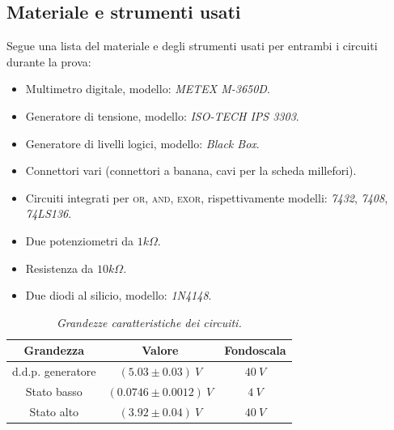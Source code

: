 \subsection{Materiale e strumenti usati}\label{subsec:materiali}
Segue una lista del materiale e degli strumenti usati per entrambi i circuiti durante la prova:
\begin{itemize}
  \item%
  Multimetro digitale, modello: \emph{METEX M-3650D}.
  \item%
  Generatore di tensione, modello: \emph{ISO-TECH IPS 3303}.
  \item%
  Generatore di livelli logici, modello: \emph{Black Box}.
  \item%
  Connettori vari (connettori a banana, cavi per la scheda millefori).
  \item%
  Circuiti integrati per \textsc{or}, \textsc{and}, \textsc{exor}, rispettivamente modelli: \emph{7432}, \emph{7408}, \emph{74LS136}.
  \item%
  Due potenziometri da $1k\Omega$.
  \item%
  Resistenza da $10k\Omega$.
  \item%
  Due diodi al silicio, modello: \emph{1N4148}.
\end{itemize}

\begin{table}[H]
  \centering
  \begin{tabular}[t]{c | c  c }
    \hline
    Grandezza & Valore & Fondoscala \\
    \hline
    d.d.p. generatore & $(5.03 \pm 0.03) \: V$ & $40 \: V$ \\
    Stato basso & $(0.0746 \pm 0.0012) \: V$ & $4 \: V$ \\
    Stato alto & $(3.92 \pm 0.04) \: V$ & $40 \: V$ \\
    \hline
  \end{tabular}
  \caption{\emph{Grandezze caratteristiche dei circuiti.}}
  \label{tab:livelli-logici}
\end{table}
